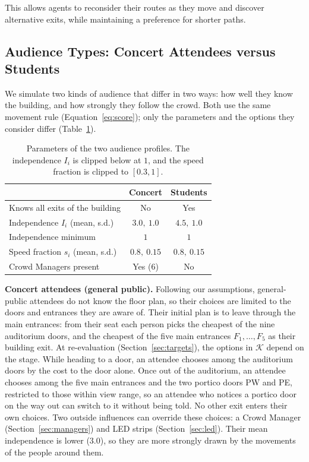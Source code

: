 \documentclass{article}
\begin{document}
This allows agents to reconsider their routes as they move and discover alternative exits, while maintaining a preference for shorter paths.

\subsection{Audience Types: Concert Attendees versus Students}
\label{sec:profiles}

We simulate two kinds of audience that differ in two ways: how well they know the building, and how strongly they follow the crowd. Both use the same movement rule (Equation~\ref{eq:score}); only the parameters and the options they consider differ (Table~\ref{tab:profiles}).

\begin{table}[H]
    \centering
    \begin{tabular}{lcc}
        \toprule
         & \textbf{Concert} & \textbf{Students} \\
        \midrule
        Knows all exits of the building & No & Yes \\
        Independence $I_i$ (mean, s.d.) & $3.0,\ 1.0$ & $4.5,\ 1.0$ \\
        Independence minimum & $1$ & $1$ \\
        Speed fraction $s_i$ (mean, s.d.) & $0.8,\ 0.15$ & $0.8,\ 0.15$ \\
        Crowd Managers present & Yes (6) & No \\
        \bottomrule
    \end{tabular}
    \caption{Parameters of the two audience profiles. The independence $I_i$ is clipped below at $1$, and the speed fraction is clipped to $[0.3,1]$.}
    \label{tab:profiles}
\end{table}

\textbf{Concert attendees (general public).} Following our assumptions, general-public attendees do not know the floor plan, so their choices are limited to the doors and entrances they are aware of. Their initial plan is to leave through the main entrances: from their seat each person picks the cheapest of the nine auditorium doors, and the cheapest of the five main entrances $F_1,\dots,F_5$ as their building exit. At re-evaluation (Section~\ref{sec:targets}), the options in $\mathcal{K}$ depend on the stage. While heading to a door, an attendee chooses among the auditorium doors by the cost to the door alone. Once out of the auditorium, an attendee chooses among the five main entrances and the two portico doors PW and PE, restricted to those within view range, so an attendee who notices a portico door on the way out can switch to it without being told. No other exit enters their own choices. Two outside influences can override these choices: a Crowd Manager (Section~\ref{sec:managers}) and LED strips (Section~\ref{sec:led}). Their mean independence is lower ($3.0$), so they are more strongly drawn by the movements of the people around them.
\end{document}

